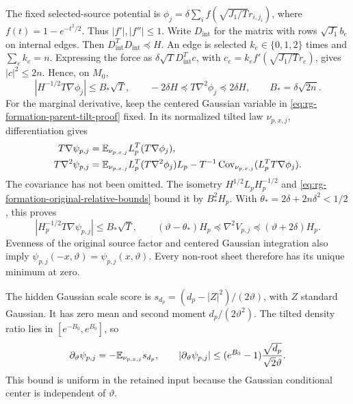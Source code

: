 The fixed selected-source potential is
$\phi_j=\delta\sum_i f(\sqrt{J_1/T}r_{i,j_i})$,
where $f(t)=1-e^{-t^2/2}$. Thus $|f'|,|f''|\le1$.
Write $D_{\mathrm{int}}$ for the matrix with rows
$\sqrt{J_1}b_e$ on internal edges. Then
$D_{\mathrm{int}}^TD_{\mathrm{int}}\preceq H$. An edge is selected
$k_e\in\{0,1,2\}$ times and $\sum_e k_e=n$. Expressing the force as
$\delta\sqrt T D_{\mathrm{int}}^Tc$, with
$c_e=k_ef'(\sqrt{J_1/T}r_e)$, gives $|c|^2\le2n$. Hence, on $M_0$,
\begin{equation}
 |H^{-1/2}T\nabla\phi_j|\le B_*\sqrt T,
 \qquad
 -2\delta H\preceq T\nabla^2\phi_j\preceq2\delta H,
 \qquad B_*=\delta\sqrt{2n}.
 \label{eq:rg-formation-original-relative-bounds}
\end{equation}
For the marginal derivative, keep the centered Gaussian variable in
\cref{eq:rg-formation-parent-tilt-proof} fixed. In its normalized tilted
law $\nu_{p,x,j}$, differentiation gives
\begin{align}
 T\nabla\psi_{p,j}
 &=\mathbb E_{\nu_{p,x,j}}L_p^T(T\nabla\phi_j),
 \label{eq:rg-formation-marginal-force-proof}\\
 T\nabla^2\psi_{p,j}
 &=\mathbb E_{\nu_{p,x,j}}L_p^T(T\nabla^2\phi_j)L_p
       -T^{-1}\operatorname{Cov}_{\nu_{p,x,j}}
                    (L_p^TT\nabla\phi_j).
 \label{eq:rg-formation-marginal-hessian-proof}
\end{align}
The covariance has not been omitted. The isometry
$H^{1/2}L_pH_p^{-1/2}$ and
\cref{eq:rg-formation-original-relative-bounds} bound it by
$B_*^2H_p$. With $\theta_*=2\delta+2n\delta^2<1/2$, this proves
\begin{equation}
 |H_p^{-1/2}T\nabla\psi_{p,j}|\le B_*\sqrt T,
 \qquad
 (\vartheta-\theta_*)H_p
 \preceq\nabla^2V_{p,j}
 \preceq(\vartheta+2\delta)H_p.
 \label{eq:rg-formation-parent-relative-bounds}
\end{equation}
Evenness of the original source factor and centered Gaussian
integration also imply $\psi_{p,j}(-x,\vartheta)=
\psi_{p,j}(x,\vartheta)$. Every non-root sheet therefore has its
unique minimum at zero.

The hidden Gaussian scale score is
$s_{d_p}=(d_p-|Z|^2)/(2\vartheta)$, with $Z$ standard Gaussian.
It has zero mean and second moment $d_p/(2\vartheta^2)$.
The tilted density ratio lies in $[e^{-B_0},e^{B_0}]$, so
\begin{equation}
 \partial_\vartheta\psi_{p,j}=-\mathbb E_{\nu_{p,x,j}}s_{d_p},\qquad
 |\partial_\vartheta\psi_{p,j}|
 \le(e^{B_0}-1)\frac{\sqrt{d_p}}{\sqrt2\vartheta}.
 \label{eq:rg-formation-tilt-score-proof}
\end{equation}
This bound is uniform in the retained input because the Gaussian
conditional center is independent of $\vartheta$.

